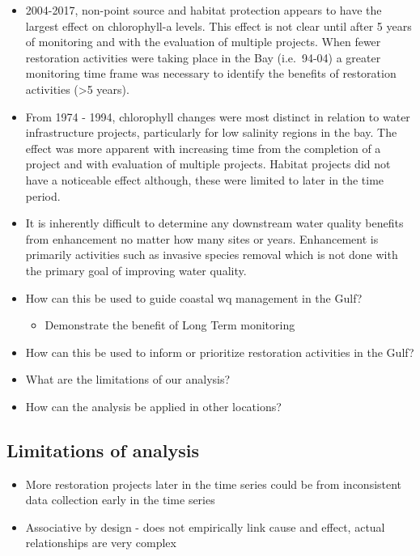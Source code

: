 \documentclass[]{article}
\providecommand{\tightlist}{%
  \setlength{\itemsep}{0pt}\setlength{\parskip}{0pt}}
\begin{document}
\begin{itemize}
\item
  2004-2017, non-point source and habitat protection appears to have the
  largest effect on chlorophyll-a levels. This effect is not clear until
  after 5 years of monitoring and with the evaluation of multiple
  projects. When fewer restoration activities were taking place in the
  Bay (i.e.~94-04) a greater monitoring time frame was necessary to
  identify the benefits of restoration activities (\textgreater{}5
  years).
\item
  From 1974 - 1994, chlorophyll changes were most distinct in relation
  to water infrastructure projects, particularly for low salinity
  regions in the bay. The effect was more apparent with increasing time
  from the completion of a project and with evaluation of multiple
  projects. Habitat projects did not have a noticeable effect although,
  these were limited to later in the time period.
\item
  It is inherently difficult to determine any downstream water quality
  benefits from enhancement no matter how many sites or years.
  Enhancement is primarily activities such as invasive species removal
  which is not done with the primary goal of improving water quality.
\item
  How can this be used to guide coastal wq management in the Gulf?

  \begin{itemize}
  \tightlist
  \item
    Demonstrate the benefit of Long Term monitoring
  \end{itemize}
\item
  How can this be used to inform or prioritize restoration activities in
  the Gulf?
\item
  What are the limitations of our analysis?
\item
  How can the analysis be applied in other locations?
\end{itemize}

\hypertarget{limitations-of-analysis}{%
\subsection{Limitations of analysis}\label{limitations-of-analysis}}

\begin{itemize}
\item
  More restoration projects later in the time series could be from
  inconsistent data collection early in the time series
\item
  Associative by design - does not empirically link cause and effect,
  actual relationships are very complex
\end{itemize}
\end{document}
